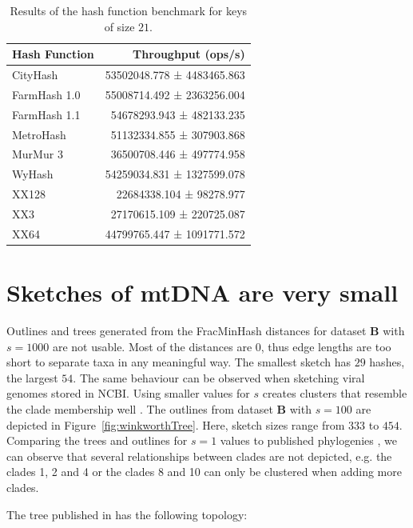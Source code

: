 \begin{table}[]
  \centering
  \begin{tabular}{@{}lr@{}}
  \toprule
  \textbf{Hash Function }& \textbf{Throughput (ops/s)}                      \\
  \midrule
  CityHash      & 53502048.778 ± 4483465.863   \\
  FarmHash 1.0  & 55008714.492 ± 2363256.004   \\
  FarmHash 1.1  & 54678293.943 ±  482133.235   \\
  MetroHash     & 51132334.855 ±  307903.868   \\
  MurMur 3      & 36500708.446 ±  497774.958   \\
  WyHash        & 54259034.831 ± 1327599.078   \\
  XX128         & 22684338.104 ±   98278.977   \\
  XX3           & 27170615.109 ±  220725.087   \\
  XX64          & 44799765.447 ± 1091771.572  \\
  \bottomrule
  \end{tabular}
  \caption{Results of the hash function benchmark for keys of size $21$.}
  \label{ta:hashbenchmark}
  \end{table}


\section{Sketches of mtDNA are very small}
Outlines and trees generated from the FracMinHash distances for dataset
\textbf{B} with $s=1000$ are not usable. Most of the distances are 0, thus edge
lengths are too short to separate taxa in any meaningful way. The smallest
sketch has $29$ hashes, the largest $54$. The same behaviour can be observed
when sketching viral genomes stored in NCBI. Using smaller values for $s$
creates clusters that resemble the clade membership well
\cite{abadPhytophthoraTaxonomicPhylogenetic2023a,yangExpandedPhylogenyGenus2017}.
The outlines from dataset \textbf{B} with $s=100$ are depicted in
Figure~\ref{fig:winkworthTree}. Here, sketch sizes range from $333$ to $454$.
Comparing the trees and outlines for $s=1$ values to published phylogenies
\cite{abadPhytophthoraTaxonomicPhylogenetic2023a,yangExpandedPhylogenyGenus2017},
we can observe that several relationships between clades are not depicted, e.g.
the clades 1, 2 and 4 or the clades 8 and 10 can only be clustered when adding
more clades.


The tree published in \cite{winkworthComparativeAnalysesComplete2022} has the
following topology:

